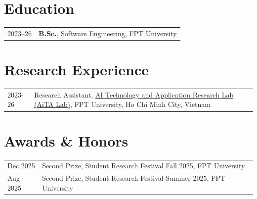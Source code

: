 
\RaggedRight

\section*{Education}
\begin{longtable}[l]{@{}p{} p{}}
  2023--26\footnotemark & \textbf{B.Sc.}, Software Engineering, FPT University \\
\end{longtable}


\renewcommand{\thefootnote}{\arabic{footnote}}
\setcounter{footnote}{1}

\section*{Research Experience}
\label{exp_research}
\begin{longtable}[l]{@{}p{} p{}}
  2023-26\footnotemark & Research Assistant, \href{https://aita-lab.github.io/}{AI Technology and Application Research Lab (AiTA Lab)}, FPT University, Ho Chi Minh City, Vietnam \\
\end{longtable}

\section*{Awards \& Honors}
\label{awards}
\begin{longtable}[l]{@{}p{} p{}}
  Dec 2025 & Second Prize, Student Research Festival Fall 2025, FPT University \\
  Aug 2025 & Second Prize, Student Research Festival Summer 2025, FPT University \\
\end{longtable}

